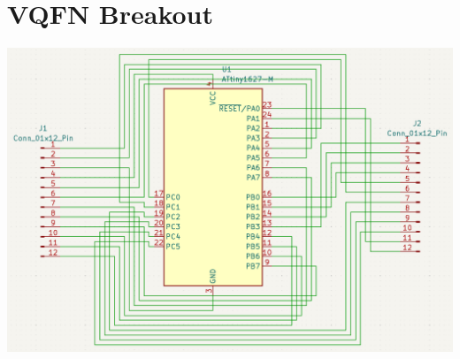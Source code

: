 \documentclass[11pt,a4paper,titlepage]{report}
\begin{document}
	\section{VQFN Breakout}\label{appendix:vqfn_breakout}
	\begin{center}
		\label{picture:breakout1}
		\includegraphics[width= \linewidth]{assets/breakout_schematic.png}
	\end{center}
\end{document}

